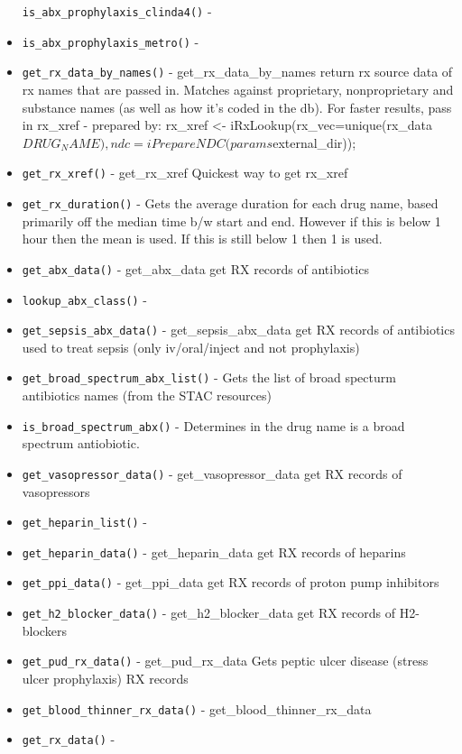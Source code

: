 \documentclass[
]{book}
\begin{document}
\begin{itemize}
  \texttt{is\_abx\_prophylaxis\_clinda4()} -
\item
  \texttt{is\_abx\_prophylaxis\_metro()} -
\item
  \texttt{get\_rx\_data\_by\_names()} - get\_rx\_data\_by\_names return rx source data of rx names that are passed in. Matches against proprietary, nonproprietary and substance names (as well as how it's coded in the db). For faster results, pass in rx\_xref - prepared by: rx\_xref \textless- iRxLookup(rx\_vec=unique(rx\_data\(DRUG_NAME),ndc=iPrepareNDC(params\)external\_dir));
\item
  \texttt{get\_rx\_xref()} - get\_rx\_xref Quickest way to get rx\_xref
\item
  \texttt{get\_rx\_duration()} - Gets the average duration for each drug name, based primarily off the median time b/w start and end. However if this is below 1 hour then the mean is used. If this is still below 1 then 1 is used.
\item
  \texttt{get\_abx\_data()} - get\_abx\_data get RX records of antibiotics
\item
  \texttt{lookup\_abx\_class()} -
\item
  \texttt{get\_sepsis\_abx\_data()} - get\_sepsis\_abx\_data get RX records of antibiotics used to treat sepsis (only iv/oral/inject and not prophylaxis)
\item
  \texttt{get\_broad\_spectrum\_abx\_list()} - Gets the list of broad specturm antibiotics names (from the STAC resources)
\item
  \texttt{is\_broad\_spectrum\_abx()} - Determines in the drug name is a broad spectrum antiobiotic.
\item
  \texttt{get\_vasopressor\_data()} - get\_vasopressor\_data get RX records of vasopressors
\item
  \texttt{get\_heparin\_list()} -
\item
  \texttt{get\_heparin\_data()} - get\_heparin\_data get RX records of heparins
\item
  \texttt{get\_ppi\_data()} - get\_ppi\_data get RX records of proton pump inhibitors
\item
  \texttt{get\_h2\_blocker\_data()} - get\_h2\_blocker\_data get RX records of H2-blockers
\item
  \texttt{get\_pud\_rx\_data()} - get\_pud\_rx\_data Gets peptic ulcer disease (stress ulcer prophylaxis) RX records
\item
  \texttt{get\_blood\_thinner\_rx\_data()} - get\_blood\_thinner\_rx\_data
\item
  \texttt{get\_rx\_data()} -
\end{itemize}
\end{document}
